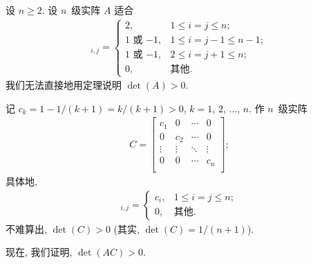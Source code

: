 \begin{example}[continues=emp:NonzeroDet3]
    设 \(n \geq 2\).
    设 \(n\)~级实阵 \(A\) 适合
    \begin{align*}
        [A]_{i,j} =
        \begin{cases}
            2,
             & 1 \leq i = j \leq n;         \\
            \text{\(1\) 或 \(-1\)},
             & 1 \leq i = j - 1 \leq n - 1; \\
            \text{\(1\) 或 \(-1\)},
             & 2 \leq i = j + 1 \leq n;     \\
            0,
             & \text{其他}.
        \end{cases}
    \end{align*}
    我们无法直接地用定理说明 \(\det {(A)} > 0\).

    记 \(c_k = 1 - 1/(k+1) = k/(k+1) > 0\),
    \(k = 1\), \(2\), \(\dots\), \(n\).
    作 \(n\)~级实阵
    \begin{align*}
        C =
        \begin{bmatrix}
            c_1    & 0      & \cdots & 0      \\
            0      & c_2    & \cdots & 0      \\
            \vdots & \vdots & \ddots & \vdots \\
            0      & 0      & \cdots & c_n    \\
        \end{bmatrix};
    \end{align*}
    具体地,
    \begin{align*}
        [C]_{i,j}
        = \begin{cases}
              c_i, & 1 \leq i = j \leq n; \\
              0,   & \text{其他}.
          \end{cases}
    \end{align*}
    不难算出, \(\det {(C)} > 0\)
    (其实, \(\det {(C)} = 1/(n+1)\)).

    现在, 我们证明, \(\det {(AC)} > 0\).


\end{example}
